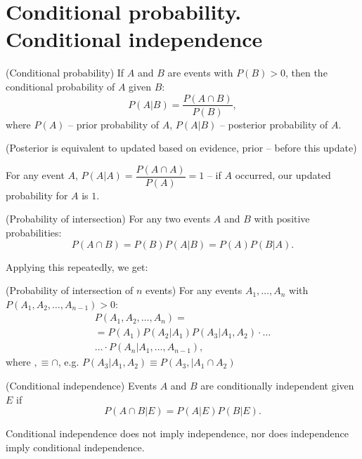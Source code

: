 \section{Conditional probability. Conditional independence}
\begin{definition}{(Conditional probability)}{}
    If $A$ and $B$ are events with $P(B) > 0$, then the conditional probability of $A$ given $B$:
    \[
        P(A| B) = \dfrac{P(A \cap B)}{P(B)},  
    \]
    where $P(A)$ -- prior probability of $A$, $P(A|B)$ -- posterior probability of $A$.
\end{definition}
\begin{note}{}{}
    (Posterior is equivalent to updated based on evidence, prior -- before this update)
    \par 
    For any event $A$, $P(A|A) = \dfrac{P(A \cap A)}{P(A)} = 1$ -- if $A$ occurred, our updated probability for $A$ is $1$.
\end{note}
\begin{theorema}{(Probability of intersection)}{}
    For any two events $A$ and $B$ with positive probabilities:
    \[
        P(A\cap B) = P(B)P(A | B) = P(A) P(B|A).    
    \]
\end{theorema}
\par 
Applying this repeatedly, we get:
\begin{theorema}{(Probability of intersection of $n$ events)}{}
    For any events $A_1, \ldots, A_n$ with $P(A_1, A_2, \ldots, A_{n-1}) > 0$:
    \[
        \begin{array}{c}
            P(A_1, A_2, \ldots, A_n) = \\ = P(A_1)P(A_2|A_1) P(A_3 | A_1,A_2)\cdot \ldots \\ \ldots \cdot P(A_n| A_1, \ldots, A_{n-1}),              
        \end{array}
    \]
    where $, \equiv \cap$, e.g. $P(A_3 | A_1, A_2) \equiv P(A_3, | A_1 \cap A_2)$
\end{theorema}

 

\begin{definition}{(Conditional independence)}{}
    Events $A$ and $B$ are conditionally independent given $E$ if 
    \[
        P(A \cap B| E) = P(A|E)P(B|E).  
    \]
\end{definition}

\begin{note}{}{}
    Conditional independence does not imply independence, nor does independence imply conditional independence.
\end{note}